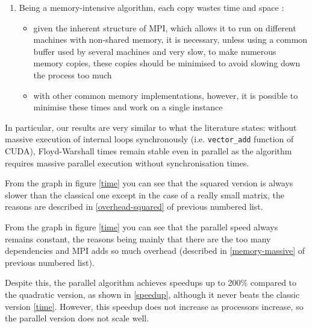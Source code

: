 \begin{enumerate}
\begin{itemize}
    \end{itemize}
    \item \label{memory-massive} Being a memory-intensive algorithm, each copy wastes time and space \cite{maras}:
    \begin{itemize}
        \item given the inherent structure of MPI, which allows it to run on different machines with non-shared memory, it is necessary, unless using a common buffer used by several machines and very slow, to make numerous memory copies, these copies should be minimised to avoid slowing down the process too much
        \item with other common memory implementations, however, it is possible to minimise these times and work on a single instance
    \end{itemize}
\end{enumerate}

In particular, our results are very similar to what the literature states: without massive execution of internal loops synchronously (i.e. \texttt{vector\_add} function of CUDA), Floyd-Warshall times remain stable even in parallel as the algorithm requires massive parallel execution without synchronisation times.

From the graph in figure \cref{time} you can see that the squared version is always slower than the classical one except in the case of a really small matrix, the reasons are described in \cref{overhead-squared} of previous numbered list.

From the graph in figure \cref{time} you can see that the parallel speed always remains constant, the reasons being mainly that there are the too many dependencies and MPI adds so much overhead (described in \cref{memory-massive} of previous numbered list).

Despite this, the parallel algorithm achieves speedups up to 200\% compared to the quadratic version, as shown in \cref{speedup}, although it never beats the classic version \cref{time}. However, this speedup does not increase as processors increase, so the parallel version does not scale well.

